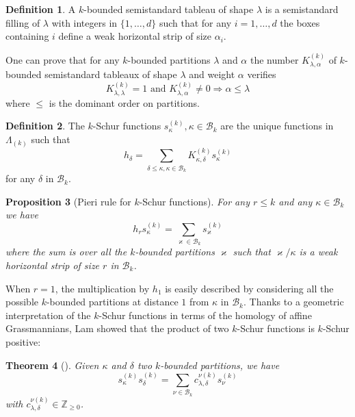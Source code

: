 \documentclass[10pt,a4paper]{amsart}
\newtheorem{theorem}{Theorem}[section]
\newtheorem{prop}[theorem]{Proposition}
\theoremstyle{definition}
\newtheorem{defi}[theorem]{Definition}
\begin{document}
\begin{defi}
A $k$-bounded semistandard tableau of shape $\lambda$ is a semistandard
filling of $\lambda$ with integers in $\{1,\ldots,d\}$ such that for any
$i=1,\ldots,d$ the boxes containing $i$ define a weak horizontal strip of size
$\alpha_{i}$.
\end{defi}

One can prove that for any $k$-bounded partitions $\lambda$ and $\alpha$ the
number $K_{\lambda,\alpha}^{(k)}$ of $k$-bounded semistandard tableaux of
shape $\lambda$ and weight $\alpha$ verifies%
\[
K_{\lambda,\lambda}^{(k)}=1\text{ and }K_{\lambda,\alpha}^{(k)}\neq
0\Longrightarrow\alpha\leq\lambda
\]
where $\leq$ is the dominant order on partitions.

\begin{defi}
The $k$-Schur functions $s_{\kappa}^{(k)},\kappa\in\mathcal{B}_{k}$ are the
unique functions in $\Lambda_{(k)}$ such that
\[
h_{\delta}=\sum_{\delta\leq\kappa,\kappa\in\mathcal{B}_{k}}K_{\kappa,\delta
}^{(k)}s_{\kappa}^{(k)}%
\]
for any $\delta$ in $\mathcal{B}_{k}$.
\end{defi}

\begin{prop}[Pieri rule for $k$-Schur functions]
For any $r\leq k$ and any $\kappa
\in\mathcal{B}_{k}$ we have
\begin{equation}
h_{r}s_{\kappa}^{(k)}=\sum_{\varkappa\in\mathcal{B}_{k}}s_{\varkappa}^{(k)}
\label{PieriKSchur}%
\end{equation}
where the sum is over all the $k$-bounded partitions $\varkappa$ such that
$\varkappa/\kappa$ is a weak horizontal strip of size $r$ in $\mathcal{B}_{k}$.
\end{prop}

When $r=1$, the multiplication by $h_{1}$ is easily described by considering
all the possible $k$-bounded partitions at distance $1$ from $\kappa$ in
$\mathcal{B}_{k}$. Thanks to a geometric interpretation of the $k$-Schur
functions in terms of the homology of affine Grassmannians, Lam showed that
the product of two $k$-Schur functions is $k$-Schur positive:

\begin{theorem}[{\cite[Corollary~8.2]{LamLR}}] Given $\kappa$ and $\delta$ two $k$-bounded partitions, we have
\[
s_{\kappa}^{(k)}s_{\delta}^{(k)}=\sum_{\nu\in\mathcal{B}_{k}}c_{\lambda
,\delta}^{\nu(k)}s_{\nu}^{(k)}%
\]
with $c_{\lambda,\delta}^{\nu(k)}\in\mathbb{Z}_{\geq0}$.
\end{theorem}
\end{document}
